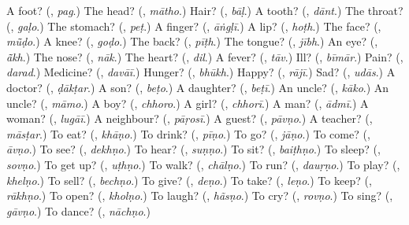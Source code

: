 \begin{tcolorbox}[breakable,colback=teal!4,colframe=teal!35!black,title={Before you move on}]
A foot? (\textbf{}, \emph{pag}.) The head? (\textbf{}, \emph{mātho}.) Hair? (\textbf{}, \emph{bāḷ}.) A tooth? (\textbf{}, \emph{dānt}.) The throat? (\textbf{}, \emph{gaḷo}.) The stomach? (\textbf{}, \emph{peṭ}.) A finger? (\textbf{}, \emph{āṅgḷī}.) A lip? (\textbf{}, \emph{hoṭh}.) The face? (\textbf{}, \emph{mū̃ḍo}.) A knee? (\textbf{}, \emph{goḍo}.) The back? (\textbf{}, \emph{pīṭh}.) The tongue? (\textbf{}, \emph{jībh}.) An eye? (\textbf{}, \emph{ā̃kh}.) The nose? (\textbf{}, \emph{nāk}.) The heart? (\textbf{}, \emph{dil}.) A fever? (\textbf{}, \emph{tāv}.) Ill? (\textbf{}, \emph{bīmār}.) Pain? (\textbf{}, \emph{darad}.) Medicine? (\textbf{}, \emph{davāī}.) Hunger? (\textbf{}, \emph{bhūkh}.) Happy? (\textbf{}, \emph{rājī}.) Sad? (\textbf{}, \emph{udās}.) A doctor? (\textbf{}, \emph{ḍākṭar}.) A son? (\textbf{}, \emph{beṭo}.) A daughter? (\textbf{}, \emph{beṭī}.) An uncle? (\textbf{}, \emph{kāko}.) An uncle? (\textbf{}, \emph{māmo}.) A boy? (\textbf{}, \emph{chhoro}.) A girl? (\textbf{}, \emph{chhorī}.) A man? (\textbf{}, \emph{ādmī}.) A woman? (\textbf{}, \emph{lugāī}.) A neighbour? (\textbf{}, \emph{pāṛosī}.) A guest? (\textbf{}, \emph{pāvṇo}.) A teacher? (\textbf{}, \emph{māsṭar}.) To eat? (\textbf{}, \emph{khāṇo}.) To drink? (\textbf{}, \emph{pīṇo}.) To go? (\textbf{}, \emph{jāṇo}.) To come? (\textbf{}, \emph{āvṇo}.) To see? (\textbf{}, \emph{dekhṇo}.) To hear? (\textbf{}, \emph{suṇṇo}.) To sit? (\textbf{}, \emph{baiṭhṇo}.) To sleep? (\textbf{}, \emph{sovṇo}.) To get up? (\textbf{}, \emph{uṭhṇo}.) To walk? (\textbf{}, \emph{chālṇo}.) To run? (\textbf{}, \emph{dauṛṇo}.) To play? (\textbf{}, \emph{khelṇo}.) To sell? (\textbf{}, \emph{bechṇo}.) To give? (\textbf{}, \emph{deṇo}.) To take? (\textbf{}, \emph{leṇo}.) To keep? (\textbf{}, \emph{rākhṇo}.) To open? (\textbf{}, \emph{kholṇo}.) To laugh? (\textbf{}, \emph{hãsṇo}.) To cry? (\textbf{}, \emph{rovṇo}.) To sing? (\textbf{}, \emph{gāvṇo}.) To dance? (\textbf{}, \emph{nāchṇo}.)
\end{tcolorbox}
